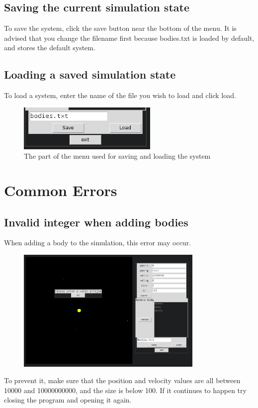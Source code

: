 \documentclass[a4paper,11pt,titlepage]{article}
\begin{document}
\subsection{Saving the current simulation state}
To save the system, click the save button near the bottom of the menu. It is
advised that you change the filename first because bodies.txt is loaded by
default, and stores the default system.

\subsection{Loading a saved simulation state}
To load a system, enter the name of the file you wish to load and click load.
\begin{figure}[H]
	\centering
	\includegraphics[width=0.6\textwidth]{../img/saveload.png}
	\caption{The part of the menu used for saving and loading the system}
\end{figure}

\section{Common Errors}
\subsection{Invalid integer when adding bodies}
When adding a body to the simulation, this error may occur.
\begin{figure}[H]
	\centering
	\includegraphics[width=0.8\textwidth]{../img/add2.png}
\end{figure}
To prevent it, make sure that the position and velocity values are all between
10000 and 10000000000, and the size is below 100. If it continues to happen try
closing the program and opening it again.
\end{document}
